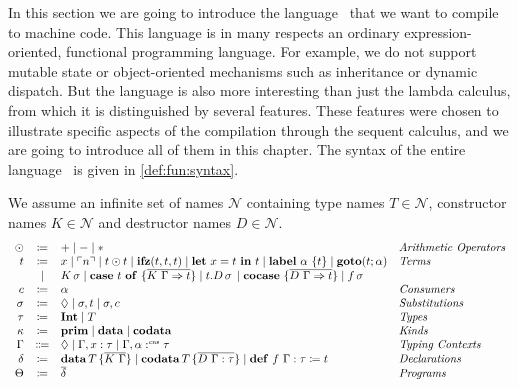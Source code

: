 In this section we are going to introduce the language \surfacelang\ that we want to compile to machine code.
This language is in many respects an ordinary expression-oriented, functional programming language.
For example, we do not support mutable state or object-oriented mechanisms such as inheritance or dynamic dispatch.
But the language is also more interesting than just the lambda calculus, from which it is distinguished by several features.
These features were chosen to illustrate specific aspects of the compilation through the sequent calculus, and we are going to introduce all of them in this chapter.
The syntax of the entire language \surfacelang\ is given in \cref{def:fun:syntax}.

\begin{definition}
  We assume an infinite set of names $\mathcal{N}$ containing type names $T\in\mathcal{N}$, constructor names $K\in\mathcal{N}$ and destructor names $D\in\mathcal{N}$.
  \[
    \begin{array}{r c l l}
      \odot  & \coloneqq & + \mid - \mid * & \emph{Arithmetic Operators} \\
      t & \coloneqq & x \mid \ulcorner n \urcorner \mid t \odot t \mid \mathbf{ifz}(t, t, t) \mid \mathbf{let}\ x = t\ \mathbf{in}\ t \mid \mathbf{label}\ \alpha\ \{t \} \mid \mathbf{goto}(t; \alpha)  & \emph{Terms}\\
      & \mid & K\,\sigma \mid \mathbf{case}\ t\ \mathbf{of}\ \{ \overline{K\ \Gamma \Rightarrow t} \} \mid t.D \,\sigma\, \mid \mathbf{cocase}\ \{ \overline{D\ \Gamma \Rightarrow t} \} \mid f\,\sigma & \\
      c & \coloneqq & \alpha & \emph{Consumers}\\
      \sigma & \coloneqq & \Diamond \mid \sigma,t \mid \sigma, c & \emph{Substitutions}\\
      \tau & \coloneqq & \mathbf{Int} \mid T & \emph{Types} \\
      \kappa & \coloneq & \mathbf{prim}\mid\mathbf{data} \mid \mathbf{codata} & \emph{Kinds} \\
      \Gamma & \Coloneqq & \Diamond \mid \Gamma, x : \tau \mid \Gamma, \alpha :^{\text{\tiny cns}} \tau & \emph{Typing Contexts} \\
      \delta & \coloneqq & \mathbf{data}\, T\, \{ \overline{K\ \Gamma} \}  \mid \mathbf{codata}\, T\, \{ \overline{D\ \Gamma : \tau} \} \mid \mathbf{def}\ f\ \Gamma : \tau \coloneq t & \emph{Declarations}\\
      \Theta & \coloneqq & \overline{\delta} & \emph{Programs}\\
    \end{array}
  \]
  \label{def:fun:syntax}
\end{definition}

